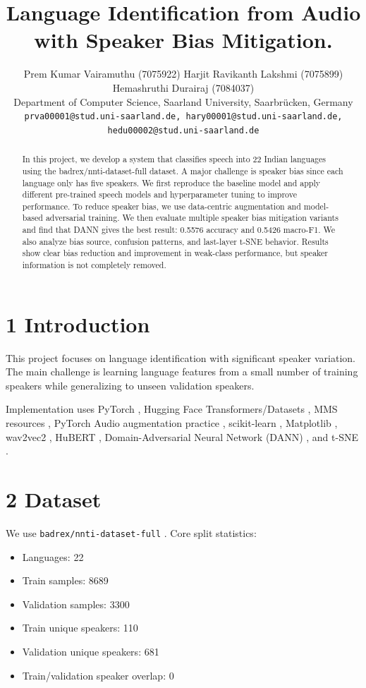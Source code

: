 \documentclass[11pt]{article}
\title{Language Identification from Audio with Speaker Bias Mitigation.}
\author{Prem Kumar Vairamuthu (7075922) \quad
Harjit Ravikanth Lakshmi (7075899) \quad
Hemashruthi Durairaj (7084037) \\
Department of Computer Science, Saarland University, Saarbrücken, Germany \\
{\footnotesize\texttt{prva00001@stud.uni-saarland.de, hary00001@stud.uni-saarland.de, hedu00002@stud.uni-saarland.de}}}
\begin{document}
\maketitle

\begin{abstract}
In this project, we develop a system that classifies speech into 22 Indian languages using the badrex/nnti-dataset-full dataset. A major challenge is
speaker bias since each language only has five speakers. We first reproduce the baseline model and apply different pre-trained speech models and
hyperparameter tuning to improve performance. To reduce speaker bias, we use data-centric augmentation and model-based adversarial training. 
We then evaluate multiple speaker bias mitigation variants and find that DANN gives the best result: 0.5576 accuracy and 0.5426 macro-F1. 
We also analyze bias source, confusion patterns, and last-layer t-SNE behavior. 
Results show clear bias reduction and improvement in weak-class performance, but speaker information is not completely removed.
\end{abstract}

\section*{1 Introduction}
This project focuses on language identification with significant speaker variation. The main challenge is learning language features from a small number of training speakers while generalizing to unseen validation speakers.

Implementation uses PyTorch \citep{paszke2019pytorch}, Hugging Face Transformers/Datasets \citep{wolf2020transformers}, MMS resources \citep{pratap2023mms,facebookmmsmodelcard}, PyTorch Audio augmentation practice \citep{pytorchaudioaugtutorial}, scikit-learn \citep{pedregosa2011scikit}, Matplotlib \citep{hunter2007matplotlib}, wav2vec2 \citep{baevski2020wav2vec2}, HuBERT \citep{hsu2021hubert}, Domain-Adversarial Neural Network (DANN) \citep{ganin2014dann}, and t-SNE \citep{maaten2008tsne}.

\section*{2 Dataset}
We use \texttt{badrex/nnti-dataset-full} \citep{badr2026dataset}. Core split statistics:
\begin{itemize}
    \item Languages: 22
    \item Train samples: 8689
    \item Validation samples: 3300
    \item Train unique speakers: 110
    \item Validation unique speakers: 681
    \item Train/validation speaker overlap: 0
\end{itemize}
\end{document}
